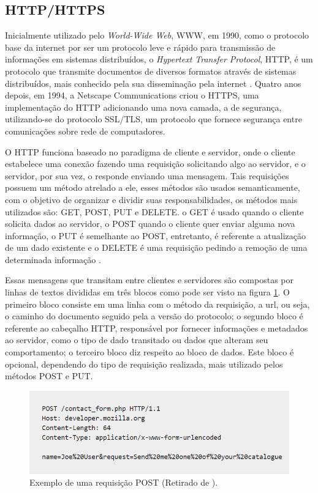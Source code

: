\subsection{HTTP/HTTPS}
\label{fund:http}
Inicialmente utilizado pelo \textit{World-Wide Web}, WWW, em 1990, como o protocolo base da internet por ser um protocolo leve e rápido para transmissão de informações em sistemas distribuídos, o \textit{Hypertext Transfer Protocol}, HTTP, é um protocolo que transmite documentos de diversos formatos através de sistemas distribuídos, mais conhecido pela sua disseminação pela internet \cite{berners1996hypertext}. Quatro anos depois, em 1994, a Netscape Communications criou o HTTPS, uma implementação do HTTP adicionando uma nova camada, a de segurança, utilizando-se do protocolo SSL/TLS, um protocolo que fornece segurança entre comunicações sobre rede de computadores.

O HTTP funciona baseado no paradigma de cliente e servidor, onde o cliente estabelece uma conexão fazendo uma requisição solicitando algo ao servidor, e o servidor, por sua vez, o responde enviando uma mensagem.  Tais requisições possuem um método atrelado a ele, esses métodos são usados semanticamente, com o objetivo de organizar e dividir suas responsabilidades, os métodos mais utilizados são: GET, POST, PUT e DELETE. o GET é usado quando o cliente solicita dados ao servidor, o POST quando o cliente quer enviar alguma nova informação, o PUT é semelhante ao POST, entretanto, é referente a atualização de um dado existente e o DELETE é uma requisição pedindo a remoção de uma determinada informação \cite{mozilla2019http}.

Essas mensagens que transitam entre clientes e servidores são compostas por linhas de textos divididas em três blocos como pode ser visto na figura \ref{fig:post-request}. O primeiro bloco consiste em uma linha com o método da requisição, a url, ou seja, o caminho do documento seguido pela a versão do protocolo; o segundo bloco é referente ao cabeçalho HTTP, responsável por fornecer informações e metadados ao servidor, como o tipo de dado transitado ou dados que alteram seu comportamento; o terceiro bloco diz respeito ao bloco de dados. Este bloco é opcional, dependendo do tipo de requisição realizada, mais utilizado pelos métodos POST e PUT.

\begin{figure}[H]
  \centering
  \includegraphics[width=.80\textwidth]{assets/post-request.png} 
  \caption{Exemplo de uma requisição POST (Retirado de \cite{mozilla2019http}).}
  \label{fig:post-request} 
\end{figure}

